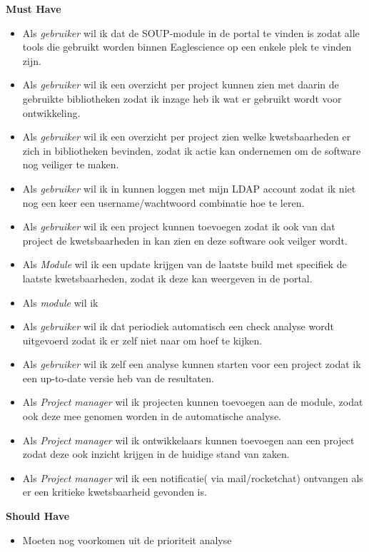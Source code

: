 \textbf{Must Have}
\begin{itemize}
    \item Als \textit{gebruiker} wil ik dat de SOUP-module in de portal te vinden is zodat alle tools die gebruikt worden binnen Eaglescience op een enkele plek te vinden zijn.
    \item Als \textit{gebruiker} wil ik een overzicht per project kunnen zien met daarin de gebruikte bibliotheken zodat ik inzage heb ik wat er gebruikt wordt voor ontwikkeling.
    \item Als \textit{gebruiker} wil ik een overzicht per project zien welke kwetsbaarheden er zich in bibliotheken bevinden, zodat ik actie kan ondernemen om de software nog veiliger te maken.
    \item Als \textit{gebruiker} wil ik in kunnen loggen met mijn LDAP account zodat ik niet nog een keer een username/wachtwoord combinatie hoe te leren.
    \item Als \textit{gebruiker} wil ik een project kunnen toevoegen zodat ik ook van dat project de kwetsbaarheden in kan zien en deze software ook veilger wordt.
    \item Als \textit{Module} wil ik een update krijgen van de laatste build met specifiek de laatste kwetsbaarheden, zodat ik deze kan weergeven in de portal.
    \item Als \textit{module} wil ik
    \item Als \textit{gebruiker} wil ik dat periodiek automatisch een check analyse wordt uitgevoerd zodat ik er zelf niet naar om hoef te kijken.
    \item Als \textit{gebruiker} wil ik zelf een analyse kunnen starten voor een project zodat ik een up-to-date versie heb van de resultaten.
    \item Als \textit{Project manager} wil ik projecten kunnen toevoegen aan de module, zodat ook deze mee genomen worden in de automatische analyse.
    \item Als \textit{Project manager} wil ik ontwikkelaars kunnen toevoegen aan een project zodat deze ook inzicht krijgen in de huidige stand van zaken.
    \item Als \textit{Project manager} wil ik een notificatie( via mail/rocketchat) ontvangen als er een kritieke kwetsbaarheid gevonden is.
\end{itemize}

\textbf{Should Have}
\begin{itemize}
    \item Moeten nog voorkomen uit de prioriteit analyse
\end{itemize}


